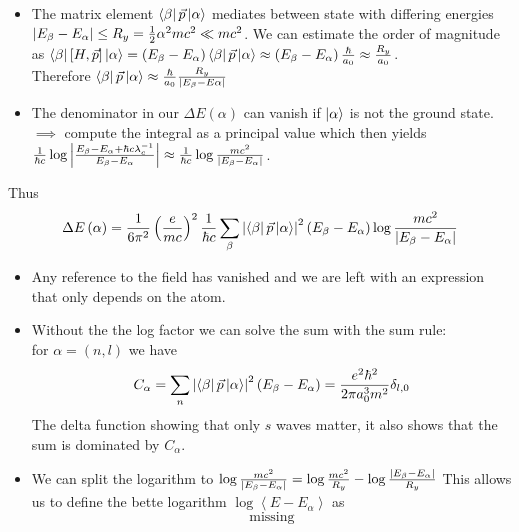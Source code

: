 \documentclass{report}
\begin{document}
\begin{itemize}
  \item The matrix element $\bra{\beta} \vec{p} \ket{\alpha}$ mediates between state with differing energies $\abs{E_\beta - E_\alpha} \le R_y = \frac{1}{2} \alpha^2 mc^2 \ll mc^2$. We can estimate the order of magnitude as $\bra{\beta} [H, \vec{p}] \ket{\alpha} = \left( E_\beta - E_\alpha \right) \bra{\beta}\vec{p} \ket{\alpha} \approx \left( E_\beta - E_\alpha \right) \frac{\hbar}{a_0} \approx \frac{R_y}{a_0}$.\\
    Therefore $\bra{\beta} \vec{p} \ket{\alpha} \approx \frac{\hbar}{a_0} \frac{R_y}{\abs{E_\beta - E\alpha}}$ 
  \item The denominator in our $\Delta E\left( \alpha \right) $ can vanish if $\ket{\alpha}$ is not the ground state. $\implies$ compute the integral as a principal value which then yields $\frac{1}{\hbar c} \log \abs{\frac{E_\beta - E_\alpha + \hbar c \lambda_c^{-1}}{E_\beta - E_\alpha}} \approx \frac{1}{\hbar c} \log \frac{mc^2}{\abs{E_\beta - E_\alpha}}$.\\
\end{itemize}
Thus \[
      \Delta E\left( \alpha \right) = \frac{1}{6\pi^2} \left( \frac{e}{mc} \right) ^2 \frac{1}{\hbar c} \sum_{\beta}^{} \abs{\bra{\beta}\vec{p}\ket{\alpha}}^2 \left( E_\beta -E_\alpha \right) \log \frac{mc^2}{\abs{E_\beta - E_\alpha}}
    \] 
\begin{itemize}
  \item Any reference to the field has vanished and we are left with an expression that only depends on the atom.
  \item Without the the log factor we can solve the sum with the sum rule:\\
    for $\alpha = \left( n,l \right) $ we have
    \begin{align*}
      C_\alpha &= \sum_{n}^{}  \abs{\bra{\beta}\vec{p}\ket{\alpha}}^2 \left( E_\beta - E_\alpha \right) = \frac{e^2\hbar^2}{2\pi a_0^{3} m^2} \delta_{l,0} \\
    \end{align*}
    The delta function showing that only $s$ waves matter, it also shows that the sum is dominated by $C_\alpha$.
  \item We can split the logarithm to $\log \frac{mc^2}{\abs{E_\beta - E_\alpha}} = \log \frac{mc^2}{R_y} - \log \frac{\abs{E_\beta - E_\alpha}}{R_y}$
    This allows us to define the bette logarithm $\log \left<E- E_\alpha\right>$ as \[
    \text{missing}
    \] 
\end{itemize}
\end{document}
